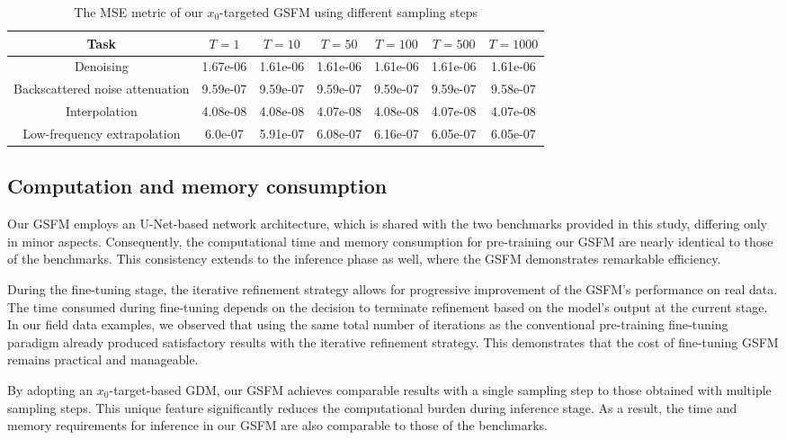 \begin{table}[htbp]
    \centering
    \caption{The MSE metric of our \(x_0\)-targeted GSFM using different sampling steps}
    \label{tab6}
    \begin{tabular}{@{} c c c c c c c @{}}
        \toprule
        Task & \(T=1\) & \(T=10\) & \(T=50\) & \(T=100\) & \(T=500\) & \(T=1000\) \\ 
        \midrule
        Denoising                        & 1.67e-06 & 1.61e-06 & 1.61e-06 & 1.61e-06 & 1.61e-06 & 1.61e-06 \\
        Backscattered noise attenuation & 9.59e-07 & 9.59e-07 & 9.59e-07 & 9.59e-07 & 9.59e-07 & 9.58e-07 \\
        Interpolation                   & 4.08e-08 & 4.08e-08 & 4.07e-08 & 4.08e-08 & 4.07e-08 & 4.07e-08 \\
        Low-frequency extrapolation     & 6.0e-07  & 5.91e-07 & 6.08e-07 & 6.16e-07 & 6.05e-07 & 6.05e-07 \\
        \bottomrule
    \end{tabular}
\end{table}

\subsection{Computation and memory consumption}
Our GSFM employs an U-Net-based network architecture, which is shared with the two benchmarks provided in this study, differing only in minor aspects. Consequently, the computational time and memory consumption for pre-training our GSFM are nearly identical to those of the benchmarks. This consistency extends to the inference phase as well, where the GSFM demonstrates remarkable efficiency. 

During the fine-tuning stage, the iterative refinement strategy allows for progressive improvement of the GSFM's performance on real data. The time consumed during fine-tuning depends on the decision to terminate refinement based on the model's output at the current stage. In our field data examples, we observed that using the same total number of iterations as the conventional pre-training fine-tuning paradigm already produced satisfactory results with the iterative refinement strategy. This demonstrates that the cost of fine-tuning GSFM remains practical and manageable. 

By adopting an $x_0$-target-based GDM, our GSFM achieves comparable results with a single sampling step to those obtained with multiple sampling steps. This unique feature significantly reduces the computational burden during inference stage. As a result, the time and memory requirements for inference in our GSFM are also comparable to those of the benchmarks. 

